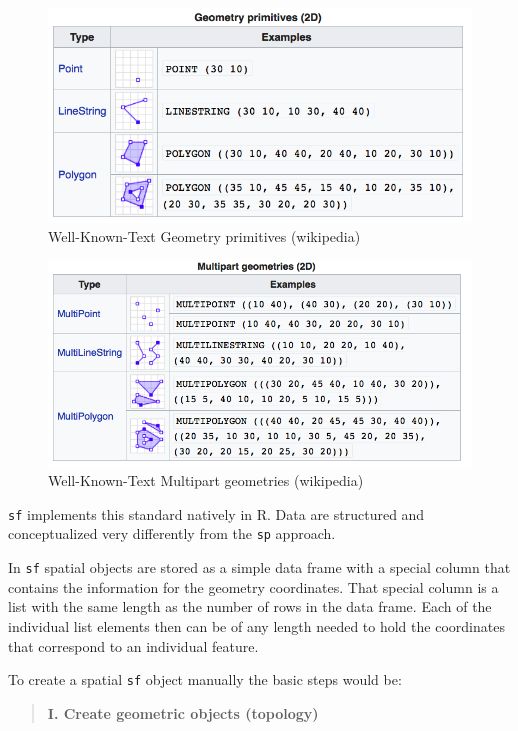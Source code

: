 \documentclass[]{book}
\begin{document}
\begin{figure}
\includegraphics[width=1\linewidth]{img/wkt_primitives} \caption{Well-Known-Text Geometry primitives  (wikipedia)}\label{fig:wkt-primitives}
\end{figure}

\begin{figure}
\includegraphics[width=1\linewidth]{img/wkt_multipart} \caption{Well-Known-Text Multipart geometries (wikipedia)}\label{fig:wkt-multipart}
\end{figure}

\texttt{sf} implements this standard natively in R. Data are structured
and conceptualized very differently from the \texttt{sp} approach.

In \texttt{sf} spatial objects are stored as a simple data frame with a
special column that contains the information for the geometry
coordinates. That special column is a list with the same length as the
number of rows in the data frame. Each of the individual list elements
then can be of any length needed to hold the coordinates that correspond
to an individual feature.

To create a spatial \texttt{sf} object manually the basic steps would
be:

\begin{quote}
\textbf{I. Create geometric objects (topology)}
\end{quote}
\end{document}
